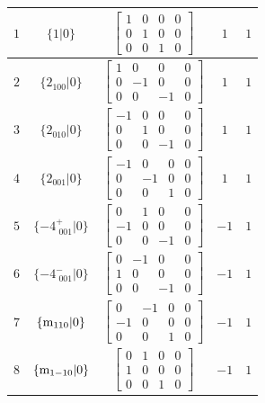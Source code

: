 \documentclass[fleqn,8pt]{jsarticle}
\begin{document}
\begin{longtable}{ccccc}
$ 1 $ & $ \{1|0\} $ & $ \begin{bmatrix} 1 & 0 & 0 & 0 \\ 0 & 1 & 0 & 0 \\ 0 & 0 & 1 & 0 \end{bmatrix} $ & $ 1 $ & $ 1 $ \\ \hline
$ 2 $ & $ \{2{}_{100}|0\} $ & $ \begin{bmatrix} 1 & 0 & 0 & 0 \\ 0 & -1 & 0 & 0 \\ 0 & 0 & -1 & 0 \end{bmatrix} $ & $ 1 $ & $ 1 $ \\ \hline
$ 3 $ & $ \{2{}_{010}|0\} $ & $ \begin{bmatrix} -1 & 0 & 0 & 0 \\ 0 & 1 & 0 & 0 \\ 0 & 0 & -1 & 0 \end{bmatrix} $ & $ 1 $ & $ 1 $ \\ \hline
$ 4 $ & $ \{2{}_{001}|0\} $ & $ \begin{bmatrix} -1 & 0 & 0 & 0 \\ 0 & -1 & 0 & 0 \\ 0 & 0 & 1 & 0 \end{bmatrix} $ & $ 1 $ & $ 1 $ \\ \hline
$ 5 $ & $ \{-4^{+}_{\,\,001}|0\} $ & $ \begin{bmatrix} 0 & 1 & 0 & 0 \\ -1 & 0 & 0 & 0 \\ 0 & 0 & -1 & 0 \end{bmatrix} $ & $ -1 $ & $ 1 $ \\ \hline
$ 6 $ & $ \{-4^{-}_{\,\,001}|0\} $ & $ \begin{bmatrix} 0 & -1 & 0 & 0 \\ 1 & 0 & 0 & 0 \\ 0 & 0 & -1 & 0 \end{bmatrix} $ & $ -1 $ & $ 1 $ \\ \hline
$ 7 $ & $ \{{\rm m}_{110}|0\} $ & $ \begin{bmatrix} 0 & -1 & 0 & 0 \\ -1 & 0 & 0 & 0 \\ 0 & 0 & 1 & 0 \end{bmatrix} $ & $ -1 $ & $ 1 $ \\ \hline
$ 8 $ & $ \{{\rm m}_{1-10}|0\} $ & $ \begin{bmatrix} 0 & 1 & 0 & 0 \\ 1 & 0 & 0 & 0 \\ 0 & 0 & 1 & 0 \end{bmatrix} $ & $ -1 $ & $ 1 $ \\ \hline

\end{longtable}
\end{document}
